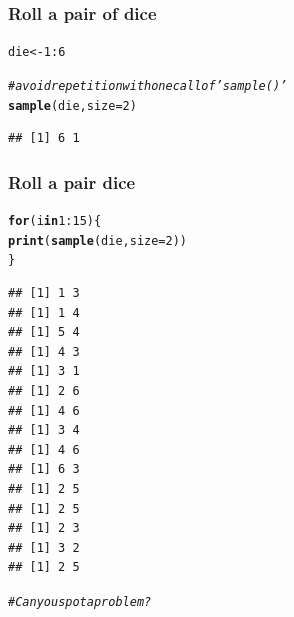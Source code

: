 \documentclass[12pt]{beamer}\usepackage[]{graphicx}\usepackage[]{color}
\makeatletter
\newcommand{\hlnum}[1]{\textcolor[rgb]{0.686,0.059,0.569}{#1}}%
\newcommand{\hlcom}[1]{\textcolor[rgb]{0.678,0.584,0.686}{\textit{#1}}}%
\newcommand{\hlopt}[1]{\textcolor[rgb]{0,0,0}{#1}}%
\newcommand{\hlstd}[1]{\textcolor[rgb]{0.345,0.345,0.345}{#1}}%
\newcommand{\hlkwa}[1]{\textcolor[rgb]{0.161,0.373,0.58}{\textbf{#1}}}%
\newcommand{\hlkwb}[1]{\textcolor[rgb]{0.69,0.353,0.396}{#1}}%
\newcommand{\hlkwc}[1]{\textcolor[rgb]{0.333,0.667,0.333}{#1}}%
\newcommand{\hlkwd}[1]{\textcolor[rgb]{0.737,0.353,0.396}{\textbf{#1}}}%
\newenvironment{kframe}{%
 \def\at@end@of@kframe{}%
 \ifinner\ifhmode%
  \def\at@end@of@kframe{\end{minipage}}%
  \begin{minipage}{\columnwidth}%
 \fi\fi%
 \def\FrameCommand##1{\hskip\@totalleftmargin \hskip-\fboxsep
 \colorbox{shadecolor}{##1}\hskip-\fboxsep
     \hskip-\linewidth \hskip-\@totalleftmargin \hskip\columnwidth}%
 \MakeFramed {\advance\hsize-\width
   \@totalleftmargin\z@ \linewidth\hsize
   \@setminipage}}%
 {\par\unskip\endMakeFramed%
 \at@end@of@kframe}
\newenvironment{knitrout}{}{} %
\makeatother
\begin{document}
\begin{frame}[fragile]
\frametitle{Roll a pair of dice}

\begin{knitrout}\footnotesize
{}\color{fgcolor}\begin{kframe}
\begin{alltt}
\hlstd{die} \hlkwb{<-} \hlnum{1}\hlopt{:}\hlnum{6}

\hlcom{# avoid repetition with one call of 'sample()'}
\hlkwd{sample}\hlstd{(die,} \hlkwc{size} \hlstd{=} \hlnum{2}\hlstd{)}
\end{alltt}
\begin{verbatim}
## [1] 6 1
\end{verbatim}
\end{kframe}
\end{knitrout}

\end{frame}


\begin{frame}[fragile]
\frametitle{Roll a pair dice}

\begin{knitrout}\scriptsize
{}\color{fgcolor}\begin{kframe}
\begin{alltt}
\hlkwa{for} \hlstd{(i} \hlkwa{in} \hlnum{1}\hlopt{:}\hlnum{15}\hlstd{) \{}
  \hlkwd{print}\hlstd{(}\hlkwd{sample}\hlstd{(die,} \hlkwc{size} \hlstd{=} \hlnum{2}\hlstd{))}
\hlstd{\}}
\end{alltt}
\begin{verbatim}
## [1] 1 3
## [1] 1 4
## [1] 5 4
## [1] 4 3
## [1] 3 1
## [1] 2 6
## [1] 4 6
## [1] 3 4
## [1] 4 6
## [1] 6 3
## [1] 2 5
## [1] 2 5
## [1] 2 3
## [1] 3 2
## [1] 2 5
\end{verbatim}
\begin{alltt}
\hlcom{# Can you spot a problem?}
\end{alltt}
\end{kframe}
\end{knitrout}

\end{frame}

\end{document}
